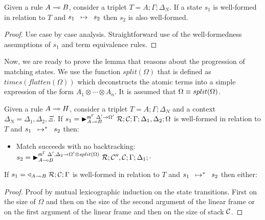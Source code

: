 \begin{theorem}
Given a rule $A \lolli B$, consider a triplet $T = A; \Gamma; \Delta_{N}$.
If a state $s_1$ is well-formed in relation to $T$ and $\trans{s_1}{s_2}$ then
$s_2$ is also well-formed.
\end{theorem}
\begin{proof}
Use case by case analysis. Straightforward use of the well-formedness
assumptions of $s_1$ and term equivalence rules.
\end{proof}

Now, we are ready to prove the lemma that reasons about the progression of
matching states. We use the function $split(\Omega)$ that is defined as
$times(flatten(\Omega))$ which deconstructs the atomic terms into a simple
expression of the form $A_1 \otimes \cdots \otimes A_n$. It is assumed that
$\feq{\Omega}{split(\Omega)}$.

  \begin{lemma}\label{thm:body_match}
  Given a rule $A \lolli H$, consider a triplet $T = A; \Gamma; \Delta_{N}$ and
  a context $\Delta_{N} = \Delta_1, \Delta_2, \Xi$.  If $s_1 = \matstate{A
  \lolli B}{\rulestk}{\lstack{C}}{\Gamma}{\Delta_1, \Delta_2}{\Omega}{\Delta'
  \rightarrow \Omega'}$ is well-formed in relation to $T$ and
  $\transs{s_1}{s_2}$ then:

  \begin{itemize}
     \item Match succeeds with no backtracking: $s_2 = \matstate{A \lolli B}{\rulestk}{\lstack{C''},
           \lstack{C}}{\Gamma}{\Delta_1}{\cdot}{\Delta', \Delta_2 \rightarrow
              \Omega' \otimes split(\Omega)}$

     

  \end{itemize}

  If $s_1 = \contstate{A \lolli B}{\rulestk}{\lstack{C}}{\Gamma}$
  is well-formed in relation to $T$ and $\transs{s_1}{s_2}$ then either:

  \begin{itemize}
     
  \end{itemize}
\end{lemma}
\begin{proof}
   Proof by mutual lexicographic induction on the state transitions. First on the size
   of $\Omega$ and then on the size of the second argument of the linear frame
   or on the first argument of the linear frame and then on the size of stack
   $\lstack{C}$.
\end{proof}

